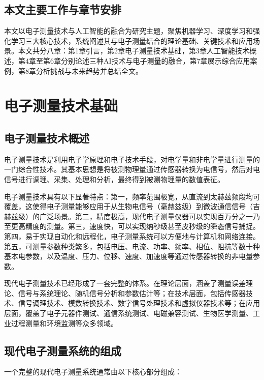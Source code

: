 \documentclass[12pt,a4paper]{article}
\numberwithin{figure}{section}
\numberwithin{table}{section}
\numberwithin{equation}{section}
\begin{document}
\subsection{本文主要工作与章节安排}

本文以电子测量技术与人工智能的融合为研究主题，聚焦机器学习、深度学习和强化学习三大核心技术，系统阐述其与电子测量结合的理论基础、关键技术和应用场景。本文共分八章：第1章引言，第2章电子测量技术基础，第3章人工智能技术概述，第4章至第6章分别论述三种AI技术与电子测量的融合，第7章展示综合应用案例，第8章分析挑战与未来趋势并总结全文。

\newpage

\section{电子测量技术基础}

\subsection{电子测量技术概述}

电子测量技术是利用电子学原理和电子技术手段，对电学量和非电学量进行测量的一门综合性技术。其基本思想是将被测物理量通过传感器转换为电信号，然后对电信号进行调理、采集、处理和分析，最终得到被测物理量的数值表征。

电子测量技术具有以下显著特点：第一，频率范围极宽，从直流到太赫兹频段均可覆盖，这使得电子测量能够应用于从生物电信号（毫赫兹级）到微波通信信号（吉赫兹级）的广泛场景。第二，精度极高，现代电子测量仪器可以实现百万分之一乃至更高精度的测量。第三，速度快，可以实现纳秒级甚至皮秒级的瞬态信号捕捉。第四，易于实现自动化和远程化，电子测量系统可以方便地与计算机和网络连接。第五，可测量参数种类繁多，包括电压、电流、功率、频率、相位、阻抗等数十种基本电参数，以及温度、压力、位移、速度、加速度等通过传感器转换的非电量参数。

现代电子测量技术已经形成了一套完整的体系。在理论层面，涵盖了测量误差理论、信号与系统理论、随机信号分析和参数估计等；在技术层面，包括传感器技术、信号调理技术、模数转换技术、数字信号处理技术和虚拟仪器技术等；在应用层面，覆盖了电子元器件测试、通信系统测试、电磁兼容测试、生物医学测量、工业过程测量和环境监测等众多领域。

\subsection{现代电子测量系统的组成}

一个完整的现代电子测量系统通常由以下核心部分组成：
\end{document}
